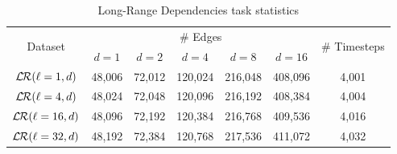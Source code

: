 \begin{table}[htbp]
    \caption{Long-Range Dependencies task statistics}
    \centering
    \begin{tabular}{c|ccccc|c}
        \toprule
        \multirow{2}{*}{Dataset} & \multicolumn{5}{c|}{$\#$ Edges} & \multirow{2}{*}{$\#$ Timesteps} \\
        & $d=1$ & $d=2$ & $d=4$ & $d=8$ & $d=16$ & \\
        \midrule
        $\longrange{\ell=1, d}$ & 48,006 & 72,012 & 120,024 & 216,048 & 408,096 & 4,001 \\
        $\longrange{\ell=4, d}$ & 48,024 & 72,048 & 120,096 & 216,192 & 408,384 & 4,004 \\
        $\longrange{\ell=16, d}$ & 48,096 & 72,192 & 120,384 & 216,768 & 409,536 & 4,016 \\
        $\longrange{\ell=32, d}$ & 48,192 & 72,384 & 120,768 & 217,536 & 411,072 & 4,032 \\
    \end{tabular}
    \label{tab:spatio_long_range_stats}
\end{table}

\begin{table}[htbp]
\caption{\benchmarkname dataset statistics and characteristics. } \label{tab:data} 
\end{table}

